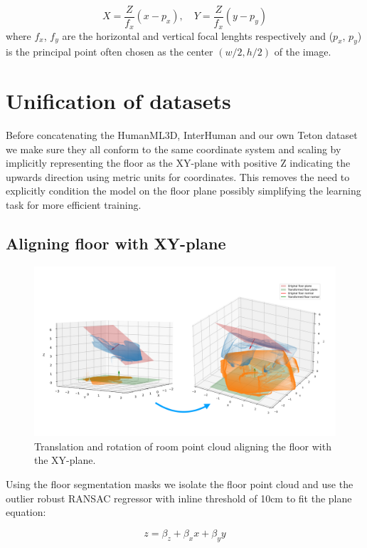 \begin{equation}
    X = \frac{Z}{f_x} \left( x - p_x \right) , \quad Y = \frac{Z}{f_x} \left(y - p_y \right)
\end{equation}
where $f_x$, $f_y$ are the horizontal and vertical focal lenghts respectively and ($p_x$, $p_y$) is the principal point often chosen as the center $(w/2,h/2)$ of the image. 

\section{Unification of datasets}
Before concatenating the HumanML3D, InterHuman and our own Teton dataset we make sure they all conform to the same coordinate system and scaling by implicitly representing the floor as the XY-plane with positive Z indicating the upwards direction using metric units for coordinates. This removes the need to explicitly condition the model on the floor plane possibly simplifying the learning task for more efficient training.


\subsection{Aligning floor with XY-plane}
\begin{figure}
    \centering
    \includegraphics[width=\linewidth]{figures/rotation.pdf}
    \caption{Translation and rotation of room point cloud aligning the floor with the XY-plane.}
    \label{fig:rotate-floor-planes}
\end{figure}

Using the floor segmentation masks we isolate the floor point cloud and use the outlier robust RANSAC regressor with inline threshold of 10cm to fit the plane equation:

\begin{equation}
    z = \beta_z + \beta_x x + \beta_y y
\end{equation}


